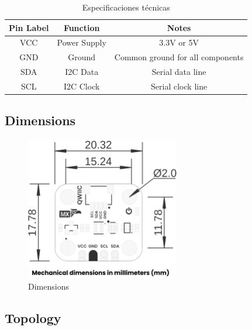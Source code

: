 \documentclass[11pt,a4paper]{article}
\begin{document}
\begin{table}[H]
\centering
\small
\begin{tabular}{|c|c|c|}
\hline
Pin Label & Function & Notes \\
\hline
VCC & Power Supply & 3.3V or 5V \\
GND & Ground & Common ground for all components \\
SDA & I2C Data & Serial data line \\
SCL & I2C Clock & Serial clock line \\
\hline
\end{tabular}
\caption{Especificaciones técnicas}
\end{table}


\subsection{Dimensions}


\begin{figure}[H]
\centering
\includegraphics[width=0.6\textwidth]{en_unit_dimension_v_1_0_0_icp10111_barometric_pressure_sensor.png}
\caption{Dimensions}
\label{fig:en-unit-dimension-v-1-0-0-icp10111-barometric-pressure-sensor-png}
\end{figure}



\subsection{Topology}
\end{document}
